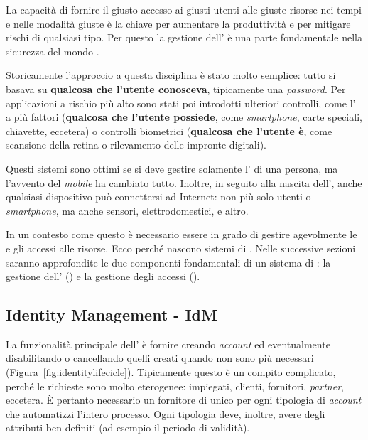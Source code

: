 La capacità di fornire il giusto accesso ai giusti utenti alle giuste risorse nei tempi e nelle modalità giuste è la chiave per aumentare la produttività e per mitigare rischi di qualsiasi tipo. Per questo la gestione dell' è una parte fondamentale nella sicurezza del mondo .

Storicamente l'approccio a questa disciplina è stato molto semplice: tutto si basava su \textbf{qualcosa che l'utente conosceva}, tipicamente una \textit{password}. Per applicazioni a rischio più alto sono stati poi introdotti ulteriori controlli, come l' a più fattori (\textbf{qualcosa che l'utente possiede}, come \textit{smartphone}, carte speciali, chiavette, eccetera) o controlli biometrici (\textbf{qualcosa che l'utente è}, come scansione della retina o rilevamento delle impronte digitali). 

Questi sistemi sono ottimi se si deve gestire solamente l' di una persona, ma l'avvento del \textit{mobile} ha cambiato tutto. Inoltre, in seguito alla nascita dell', anche qualsiasi dispositivo può connettersi ad Internet: non più solo utenti o \textit{smartphone}, ma anche sensori, elettrodomestici, e altro. 

In un contesto come questo è necessario essere in grado di gestire agevolmente le  e gli accessi alle risorse. Ecco perché nascono sistemi di . Nelle successive sezioni saranno approfondite le due componenti fondamentali di un sistema di : la gestione dell' () e la gestione degli accessi ().

\subsection{Identity Management - IdM}
La funzionalità principale dell' è fornire  creando \textit{account} ed eventualmente disabilitando o cancellando quelli creati quando non sono più necessari (Figura~\ref{fig:identitylifecicle}). Tipicamente questo è un compito complicato, perché le  richieste sono molto eterogenee: impiegati, clienti, fornitori, \textit{partner}, eccetera. È pertanto necessario un fornitore di  unico per ogni tipologia di \textit{account} che automatizzi l'intero processo. Ogni tipologia deve, inoltre, avere degli attributi ben definiti (ad esempio il periodo di validità).

